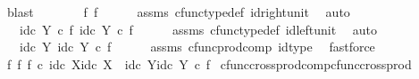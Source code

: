 \begin{isabellebody}
\ blast\isanewline
\ \ \isamarkupfalse%
\ \isamarkupfalse%
\ {\isachardoublequoteopen}{\isachardot}{\kern0pt}{\isachardot}{\kern0pt}{\isachardot}{\kern0pt}\ {\isacharequal}{\kern0pt}\ {\isasymlangle}f{\isacharcomma}{\kern0pt}\ f{\isasymrangle}{\isachardoublequoteclose}\isanewline
\ \ \ \ \isamarkupfalse%
\ assms\ cfunc{\isacharunderscore}{\kern0pt}type{\isacharunderscore}{\kern0pt}def\ id{\isacharunderscore}{\kern0pt}right{\isacharunderscore}{\kern0pt}unit\ \isamarkupfalse%
\ auto\isanewline
\ \ \isamarkupfalse%
\ \isamarkupfalse%
\ {\isachardoublequoteopen}{\isachardot}{\kern0pt}{\isachardot}{\kern0pt}{\isachardot}{\kern0pt}\ {\isacharequal}{\kern0pt}\ {\isasymlangle}id\isactrlsub c\ Y\ {\isasymcirc}\isactrlsub c\ f{\isacharcomma}{\kern0pt}\ id\isactrlsub c\ Y\ {\isasymcirc}\isactrlsub c\ f{\isasymrangle}{\isachardoublequoteclose}\isanewline
\ \ \ \ \isamarkupfalse%
\ assms\ cfunc{\isacharunderscore}{\kern0pt}type{\isacharunderscore}{\kern0pt}def\ id{\isacharunderscore}{\kern0pt}left{\isacharunderscore}{\kern0pt}unit\ \isamarkupfalse%
\ auto\isanewline
\ \ \isamarkupfalse%
\ \isamarkupfalse%
\ {\isachardoublequoteopen}{\isachardot}{\kern0pt}{\isachardot}{\kern0pt}{\isachardot}{\kern0pt}\ {\isacharequal}{\kern0pt}\ {\isasymlangle}id\isactrlsub c\ Y{\isacharcomma}{\kern0pt}\ id\isactrlsub c\ Y{\isasymrangle}\ {\isasymcirc}\isactrlsub c\ f{\isachardoublequoteclose}\isanewline
\ \ \ \ \isamarkupfalse%
\ assms\ cfunc{\isacharunderscore}{\kern0pt}prod{\isacharunderscore}{\kern0pt}comp\ id{\isacharunderscore}{\kern0pt}type\ \isamarkupfalse%
\ fastforce\isanewline
\ \ \isamarkupfalse%
\ \isamarkupfalse%
\ {\isachardoublequoteopen}{\isacharparenleft}{\kern0pt}f\ {\isasymtimes}\isactrlsub f\ f{\isacharparenright}{\kern0pt}\ {\isasymcirc}\isactrlsub c\ {\isasymlangle}id\isactrlsub c\ X{\isacharcomma}{\kern0pt}id\isactrlsub c\ X{\isasymrangle}\ {\isacharequal}{\kern0pt}\ {\isasymlangle}id\isactrlsub c\ Y{\isacharcomma}{\kern0pt}id\isactrlsub c\ Y{\isasymrangle}\ {\isasymcirc}\isactrlsub c\ f{\isachardoublequoteclose}\isacommand{{\isachardot}{\kern0pt}}\isamarkupfalse%
\isanewline
{}\isamarkupfalse%
%
\endisatagproof
{\isafoldproof}%
%
\isadelimproof
\isanewline
%
\endisadelimproof
\isanewline
{}\isamarkupfalse%
\ cfunc{\isacharunderscore}{\kern0pt}cross{\isacharunderscore}{\kern0pt}prod{\isacharunderscore}{\kern0pt}comp{\isacharunderscore}{\kern0pt}cfunc{\isacharunderscore}{\kern0pt}cross{\isacharunderscore}{\kern0pt}prod{\isacharcolon}{\kern0pt}\isanewline

\end{isabellebody}
